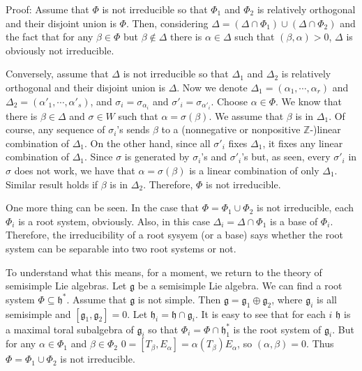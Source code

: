 \documentclass{article}
\newcommand{\InZ}{\mathbb{Z}}
\newcommand{\lie}[1]{\mathfrak{#1}}
\begin{document}
Proof: Assume that $\Phi$ is not irreducible so that $\Phi_1$ and $\Phi_2$ is relatively orthogonal and their disjoint union is $\Phi$.
Then, considering $\Delta = (\Delta \cap \Phi_1) \cup (\Delta \cap \Phi_2)$ and the fact that for any $\beta \in \Phi$ but $\beta \notin \Delta$ there is $\alpha \in \Delta$ such that $(\beta, \alpha) > 0$, $\Delta$ is obviously not irreducible.

Conversely, assume that $\Delta$ is not irreducible so that $\Delta_1$ and $\Delta_2$ is relatively orthogonal and their disjoint union is $\Delta$.
Now we denote $\Delta_1 = (\alpha_1, \cdots, \alpha_r)$ and $\Delta_2 = (\alpha'_1, \cdots, \alpha'_s)$, and $\sigma_i = \sigma_{\alpha_i}$ and $\sigma'_i = \sigma_{\alpha'_i}$.
Choose $\alpha \in \Phi$.
We know that there is $\beta \in \Delta$ and $\sigma \in W$ such that $\alpha = \sigma(\beta)$.
We assume that $\beta$ is in $\Delta_1$.
Of course, any sequence of $\sigma_i$'s sends $\beta$ to a (nonnegative or nonpositive $\InZ$-)linear combination of $\Delta_1$.
On the other hand, since all $\sigma'_i$ fixes $\Delta_1$, it fixes any linear combination of $\Delta_1$.
Since $\sigma$ is generated by $\sigma_i$'s and $\sigma'_i$'s but, as seen, every $\sigma'_i$ in $\sigma$ does not work, we have that $\alpha = \sigma(\beta)$ is a linear combination of only $\Delta_1$.
Similar result holds if $\beta$ is in $\Delta_2$.
Therefore, $\Phi$ is not irreducible.

One more thing can be seen.
In the case that $\Phi = \Phi_1 \cup \Phi_2$ is not irreducible, each $\Phi_i$ is a root system, obviously.
Also, in this case $\Delta_i = \Delta \cap \Phi_1$ is a base of $\Phi_i$.
Therefore, the irreducibility of a root sysyem (or a base) says whether the root system can be separable into two root systems or not.

To understand what this means, for a moment, we return to the theory of semisimple Lie algebras.
Let $\lie{g}$ be a semisimple Lie algebra.
We can find a root system $\Phi \subseteq \lie{h}^*$.
Assume that $\lie{g}$ is not simple.
Then $\lie{g} = \lie{g}_1 \oplus \lie{g}_2$, where $\lie{g}_i$ is all semisimple and $[\lie{g}_1, \lie{g}_2] = 0$.
Let $\lie{h}_i = \lie{h} \cap \lie{g}_i$.
It is easy to see that for each $i$ $\lie{h}$ is a maximal toral subalgebra of $\lie{g}_i$ so that $\Phi_i = \Phi \cap \lie{h}_1^*$ is the root system of $\lie{g}_i$.
But for any $\alpha \in \Phi_1$ and $\beta \in \Phi_2$ $0 = [T_\beta, E_\alpha] = \alpha(T_\beta) E_\alpha$, so $(\alpha, \beta) = 0$.
Thus $\Phi = \Phi_1 \cup \Phi_2$ is not irreducible.
\end{document}
